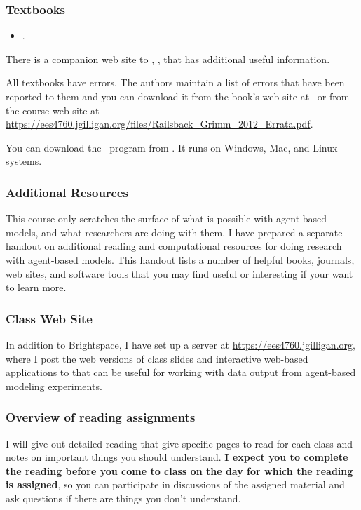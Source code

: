 \documentclass[11pt,twoside]{jgsyllabus}\usepackage[]{graphicx}\usepackage[]{color}
\begin{document}
\subsubsection{Textbooks}
\begin{itemize}
	\item \LongRailsback.
\end{itemize}

There is a companion web site to \emph{\Railsback}, \RailsbackURL, that has
additional useful information.

All textbooks have errors. The authors maintain a list of errors that have been
reported to them and you can download it from the book's web site at
\RailsbackURL\ or from the course web site at
\url{https://ees4760.jgilligan.org/files/Railsback_Grimm_2012_Errata.pdf}.

You can download the \NetLogo\ program from \NetLogoURL. It runs on Windows,
Mac, and Linux systems.

\subsubsection{Additional Resources}
This course only scratches the surface of what is possible with agent-based
models, and what researchers are doing with them.
I have prepared a separate handout on additional reading and computational
resources for doing research with agent-based models.
This handout lists a number of helpful books, journals, web sites, and software
tools that you may find useful or interesting if your want to learn more.

\subsubsection{Class Web Site}
In addition to Brightspace,
I have set up a server at \url{https://ees4760.jgilligan.org}, where I post the
web versions of class slides and interactive web-based applications to that can
be useful for working with data output from agent-based modeling experiments.

\subsubsection{Overview of reading assignments}
I will give out detailed reading that give specific pages to read for each class
and notes on important things you should understand.
\textbf{I expect you to complete the reading before you come to class on the day
for which the reading is assigned}, so you can participate in discussions of the
assigned material and ask questions if there are things you don't understand.
\end{document}
